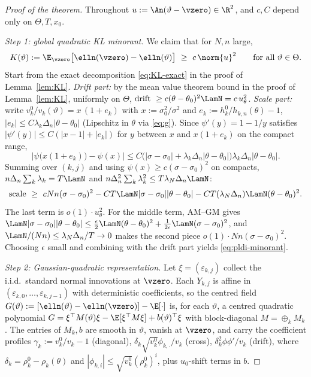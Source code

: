 \closuredraft
\begin{proof}[Proof of the theorem]
Throughout $u:=\An(\vartheta-\vzero)\in\R^2$, and $c,C$ depend only on
$\Theta,T,x_0$.

\emph{Step 1: global quadratic KL minorant.}
We claim that for $N,n$ large,
\begin{equation}\label{eq:pldi-minorant}
 K(\vartheta):=\E_{\vzero}\big[\elln(\vzero)-\elln(\vartheta)\big]
 \ \ge\ c\,\norm{u}^2
 \qquad\text{for all }\vartheta\in\Theta .
\end{equation}
Start from the exact decomposition \eqref{eq:KL-exact} in the proof of Lemma~\ref{lem:KL}. \emph{Drift part:}
by the mean value theorem bound in the proof of Lemma~\ref{lem:KL}, uniformly on $\Theta$,
$\text{drift}\ \ge c(\theta-\theta_0)^2\LamN=c\,u_\theta^2$. \emph{Scale
part:} write $v^0_k/v_k(\vartheta)=x\,(1+e_k)$ with $x:=\sigma_0^2/\sigma^2$
and $e_k:=h^0_k/h_{k,n}(\theta)-1$, $|e_k|\le C\lambda_k\Delta_n
|\theta-\theta_0|$ (Lipschitz in $\theta$ via \eqref{eq:g}). Since
$\psi'(y)=1-1/y$ satisfies $|\psi'(y)|\le C(|x-1|+|e_k|)$ for $y$ between
$x$ and $x(1+e_k)$ on the compact range,
\[
 \big|\psi\big(x(1+e_k)\big)-\psi(x)\big|
 \le C\big(|\sigma-\sigma_0|+\lambda_k\Delta_n|\theta-\theta_0|\big)
 \lambda_k\Delta_n|\theta-\theta_0| .
\]
Summing over $(k,j)$ and using $\psi(x)\ge c(\sigma-\sigma_0)^2$ on
compacts, $n\Delta_n\sum_k\lambda_k=T\LamN$ and
$n\Delta_n^2\sum_k\lambda_k^2\le T\lambda_N\Delta_n\LamN$:
\[
 \text{scale}\ \ge\ cNn(\sigma-\sigma_0)^2
 -CT\LamN|\sigma-\sigma_0||\theta-\theta_0|
 -CT(\lambda_N\Delta_n)\LamN(\theta-\theta_0)^2 .
\]
The last term is $o(1)\cdot u_\theta^2$. For the middle term, AM--GM gives
$\LamN|\sigma-\sigma_0||\theta-\theta_0|\le\tfrac{\epsilon}{2}\LamN
(\theta-\theta_0)^2+\tfrac{1}{2\epsilon}\LamN(\sigma-\sigma_0)^2$, and
$\LamN/(Nn)\le\lambda_N\Delta_n/T\to0$ makes the second piece
$o(1)\cdot Nn(\sigma-\sigma_0)^2$. Choosing $\epsilon$ small and combining
with the drift part yields \eqref{eq:pldi-minorant}.

\emph{Step 2: Gaussian-quadratic representation.}
Let $\xi=(\varepsilon_{k,j})$ collect the i.i.d.\ standard normal
innovations at $\vzero$. Each $Y_{k,j}$ is affine in
$(\varepsilon_{k,0},\ldots,\varepsilon_{k,j-1})$ with deterministic
coefficients, so the centred field
$G(\vartheta):=[\elln(\vartheta)-\elln(\vzero)]-\E[\cdot]$ is, for each
$\vartheta$, a centred quadratic polynomial
$G=\xi^\top M(\vartheta)\xi-\E[\xi^\top M\xi]+b(\vartheta)^\top\xi$ with
block-diagonal $M=\oplus_kM_k$. The entries of $M_k,b$ are smooth in
$\vartheta$, vanish at $\vzero$, and carry the coefficient profiles
$\gamma_k:=v^0_k/v_k-1$ (diagonal), $\delta_k\sqrt{v^0_k}\phi_{k,\cdot}/v_k$
(cross), $\delta_k^2\phi\phi'/v_k$ (drift), where
$\delta_k=\rho^0_k-\rho_k(\theta)$ and $|\phi_{k,i}|\le\sqrt{v^0_k}
(\rho^0_k)^i$, plus $u_0$-shift terms in $b$.


\end{proof}
